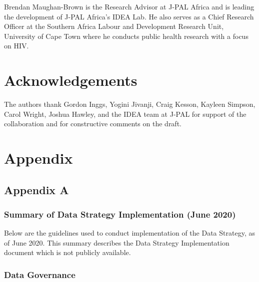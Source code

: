 \documentclass[
]{book}
\begin{document}
Brendan Maughan-Brown is the Research Advisor at J-PAL Africa and is leading the development of J-PAL Africa's IDEA Lab. He also serves as a Chief Research Officer at the Southern Africa Labour and Development Research Unit, University of Cape Town where he conducts public health research with a focus on HIV.

\hypertarget{acknowledgements-3}{%
\section*{Acknowledgements}\label{acknowledgements-3}}

The authors thank Gordon Inggs, Yogini Jivanji, Craig Kesson, Kayleen Simpson, Carol Wright, Joshua Hawley, and the IDEA team at J-PAL for support of the collaboration and for constructive comments on the draft.

\hypertarget{appendix-6}{%
\section*{Appendix}\label{appendix-6}}

\hypertarget{appendix-a-3}{%
\subsection*{Appendix A}\label{appendix-a-3}}

\hypertarget{summary-of-data-strategy-implementation-june-2020}{%
\subsubsection*{Summary of Data Strategy Implementation (June 2020)}\label{summary-of-data-strategy-implementation-june-2020}}

Below are the guidelines used to conduct implementation of the Data Strategy, as of June 2020. This summary describes the Data Strategy Implementation document which is not publicly available.

\hypertarget{data-governance}{%
\subsubsection*{Data Governance}\label{data-governance}}
\end{document}
